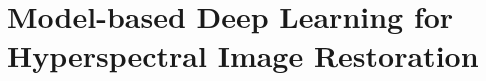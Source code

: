 
\lhead[\fancyplain{}{\leftmark}]%
      {\fancyplain{}{}} %
\chead[\fancyplain{}{}]%
      {\fancyplain{}{}}
\rhead[\fancyplain{}{}]%
      {\fancyplain{}{\rightmark}}%
\lfoot[\fancyplain{}{}]%
      {\fancyplain{}{}}
\cfoot[\fancyplain{}{\thepage}]%
      {\fancyplain{}{\thepage}} %
\rfoot[\fancyplain{}{}]%
     {\fancyplain{}{\scriptsize}}



\chapter{Model-based Deep Learning for Hyperspectral Image Restoration}
\label{ch:T3SC}


